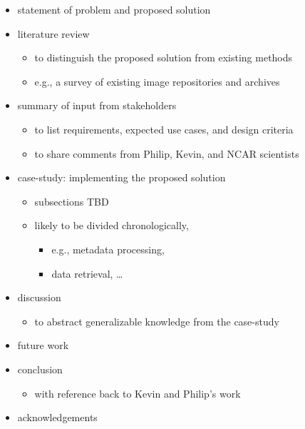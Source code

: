 \documentclass[a0paper]{betterposter}
\begin{document}
{\begin{itemize}
  \begin{itemize}
  \tightlist
  \item
    to contextualize the project with reference to Kevin and Philip's
    work
  \end{itemize}
\item
  statement of problem and proposed solution
\item
  literature review

  \begin{itemize}
  \tightlist
  \item
    to distinguish the proposed solution from existing methods
  \item
    e.g., a survey of existing image repositories and archives
  \end{itemize}
\item
  summary of input from stakeholders

  \begin{itemize}
  \tightlist
  \item
    to list requirements, expected use cases, and design criteria
  \item
    to share comments from Philip, Kevin, and NCAR scientists
  \end{itemize}
\item
  case-study: implementing the proposed solution

  \begin{itemize}
  \tightlist
  \item
    subsections TBD
  \item
    likely to be divided chronologically,

    \begin{itemize}
    \tightlist
    \item
      e.g., metadata processing,
    \item
      data retrieval, \ldots{}
    \end{itemize}
  \end{itemize}
\item
  discussion

  \begin{itemize}
  \tightlist
  \item
    to abstract generalizable knowledge from the case-study
  \end{itemize}
\item
  future work
\item
  conclusion

  \begin{itemize}
  \tightlist
  \item
    with reference back to Kevin and Philip's work
  \end{itemize}
\item
  acknowledgements


\end{itemize}}
\end{document}
